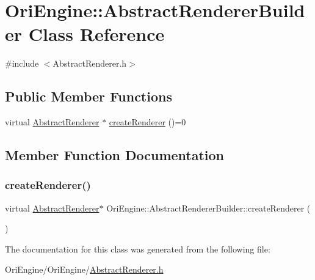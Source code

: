 \hypertarget{class_ori_engine_1_1_abstract_renderer_builder}{}\section{Ori\+Engine\+:\+:Abstract\+Renderer\+Builder Class Reference}
\label{class_ori_engine_1_1_abstract_renderer_builder}


{\ttfamily \#include $<$Abstract\+Renderer.\+h$>$}

\subsection*{Public Member Functions}
\begin{DoxyCompactItemize}
\item 
virtual \hyperlink{class_ori_engine_1_1_abstract_renderer}{Abstract\+Renderer} $\ast$ \hyperlink{class_ori_engine_1_1_abstract_renderer_builder_a15d2618b23fdbfa81fe80c02135871ca}{create\+Renderer} ()=0
\end{DoxyCompactItemize}


\subsection{Member Function Documentation}
\hypertarget{class_ori_engine_1_1_abstract_renderer_builder_a15d2618b23fdbfa81fe80c02135871ca}{}\label{class_ori_engine_1_1_abstract_renderer_builder_a15d2618b23fdbfa81fe80c02135871ca} 
\subsubsection{\texorpdfstring{create\+Renderer()}{createRenderer()}}
{\footnotesize\ttfamily virtual \hyperlink{class_ori_engine_1_1_abstract_renderer}{Abstract\+Renderer}$\ast$ Ori\+Engine\+::\+Abstract\+Renderer\+Builder\+::create\+Renderer (\begin{DoxyParamCaption}{ }\end{DoxyParamCaption})\hspace{0.3cm}{\ttfamily [pure virtual]}}



The documentation for this class was generated from the following file\+:\begin{DoxyCompactItemize}
\item 
Ori\+Engine/\+Ori\+Engine/\hyperlink{_abstract_renderer_8h}{Abstract\+Renderer.\+h}\end{DoxyCompactItemize}
